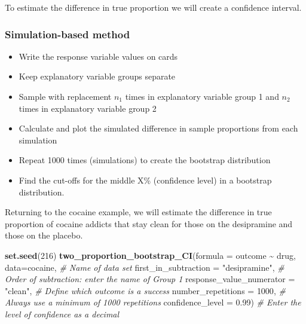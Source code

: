 \documentclass[
]{report}
\newenvironment{Shaded}{\begin{snugshade}}{\end{snugshade}}
\newcommand{\AttributeTok}[1]{\textcolor[rgb]{0.13,0.29,0.53}{#1}}
\newcommand{\CommentTok}[1]{\textcolor[rgb]{0.56,0.35,0.01}{\textit{#1}}}
\newcommand{\DecValTok}[1]{\textcolor[rgb]{0.00,0.00,0.81}{#1}}
\newcommand{\FloatTok}[1]{\textcolor[rgb]{0.00,0.00,0.81}{#1}}
\newcommand{\FunctionTok}[1]{\textcolor[rgb]{0.13,0.29,0.53}{\textbf{#1}}}
\newcommand{\NormalTok}[1]{#1}
\newcommand{\SpecialCharTok}[1]{\textcolor[rgb]{0.81,0.36,0.00}{\textbf{#1}}}
\newcommand{\StringTok}[1]{\textcolor[rgb]{0.31,0.60,0.02}{#1}}
\begin{document}
To estimate the difference in true proportion we will create a confidence interval.

\subsubsection*{Simulation-based method}\label{simulation-based-method-5}

\begin{itemize}
\item
  Write the response variable values on cards
\item
  Keep explanatory variable groups separate
\item
  Sample with replacement \(n_1\) times in explanatory variable group 1 and \(n_2\) times in explanatory variable group 2
\item
  Calculate and plot the simulated difference in sample proportions from each simulation
\item
  Repeat 1000 times (simulations) to create the bootstrap distribution
\item
  Find the cut-offs for the middle X\% (confidence level) in a bootstrap distribution.
\end{itemize}

Returning to the cocaine example, we will estimate the difference in true proportion of cocaine addicts that stay clean for those on the desipramine and those on the placebo.

\begin{Shaded}
\begin{Highlighting}[]
\FunctionTok{set.seed}\NormalTok{(}\DecValTok{216}\NormalTok{)}
\FunctionTok{two\_proportion\_bootstrap\_CI}\NormalTok{(}\AttributeTok{formula =}\NormalTok{ outcome }\SpecialCharTok{\textasciitilde{}}\NormalTok{ drug, }
        \AttributeTok{data=}\NormalTok{cocaine, }\CommentTok{\# Name of data set}
        \AttributeTok{first\_in\_subtraction =} \StringTok{"desipramine"}\NormalTok{, }\CommentTok{\# Order of subtraction: enter the name of Group 1}
        \AttributeTok{response\_value\_numerator =} \StringTok{"clean"}\NormalTok{, }\CommentTok{\# Define which outcome is a success }
        \AttributeTok{number\_repetitions =} \DecValTok{1000}\NormalTok{, }\CommentTok{\# Always use a minimum of 1000 repetitions}
        \AttributeTok{confidence\_level =} \FloatTok{0.99}\NormalTok{) }\CommentTok{\# Enter the level of confidence as a decimal}
\end{Highlighting}
\end{Shaded}
\end{document}
